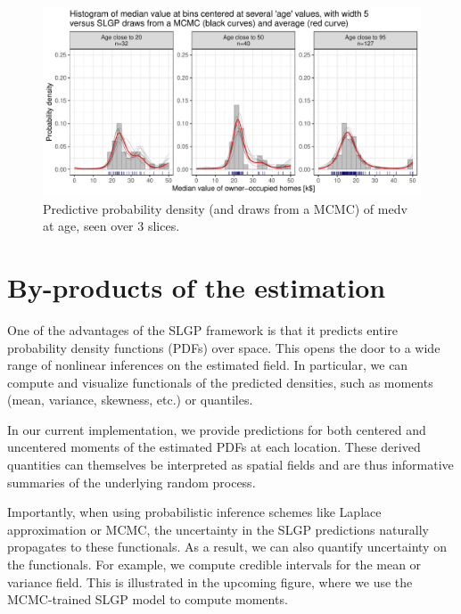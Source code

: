 \documentclass[
]{article}
\begin{document}
\begin{figure}[H]

{\centering \includegraphics{IntroductionSLGP_files/figure-latex/SLGPMCMCplot-1} 

}

\caption{Predictive probability density (and draws from a MCMC) of medv at age, seen over 3 slices.}\label{fig:SLGPMCMCplot}
\end{figure}

\section{By-products of the estimation}\label{by-products-of-the-estimation}

One of the advantages of the SLGP framework is that it predicts entire probability density functions (PDFs) over space. This opens the door to a wide range of nonlinear inferences on the estimated field. In particular, we can compute and visualize functionals of the predicted densities, such as moments (mean, variance, skewness, etc.) or quantiles.

In our current implementation, we provide predictions for both centered and uncentered moments of the estimated PDFs at each location. These derived quantities can themselves be interpreted as spatial fields and are thus informative summaries of the underlying random process.

Importantly, when using probabilistic inference schemes like Laplace approximation or MCMC, the uncertainty in the SLGP predictions naturally propagates to these functionals. As a result, we can also quantify uncertainty on the functionals. For example, we compute credible intervals for the mean or variance field. This is illustrated in the upcoming figure, where we use the MCMC-trained SLGP model to compute moments.
\end{document}
